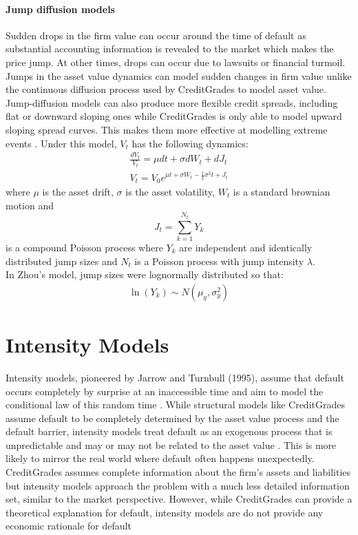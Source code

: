 \documentclass[11t,a4paper]{article}
\begin{document}
\paragraph {Jump diffusion models}
Sudden drops in the firm value can occur around the time of default as substantial accounting information is revealed to the market which makes the price jump. At other times, drops can occur due to lawsuits or financial turmoil. Jumps in the asset value dynamics can model sudden changes in firm value unlike the continuous diffusion process used by CreditGrades to model asset value. Jump-diffusion models can also produce more flexible credit spreads, including flat or downward sloping ones while CreditGrades is only able to model upward sloping spread curves. This makes them more effective at modelling extreme events \cite{zhou}. 
Under this model, $V_t$ has the following dynamics:
\begin{gather}
    \frac{dV_t}{V_t} = \mu dt + \sigma dW_t + dJ_t \\
    V_t = V_0 e^{\mu t + \sigma W_t - \frac{1}{2}\sigma^2t + J_t} 
\end{gather}
where $\mu$ is the asset drift, $\sigma$ is the asset volatility, $W_t$ is a standard brownian motion and \[J_t = \sum_{k=1}^{N_t}Y_k\]
is a compound Poisson process where $Y_k$ are independent and identically distributed jump sizes and $N_t$ is a Poisson process with jump intensity $\lambda$. \\
In Zhou's model, jump sizes were lognormally distributed so that:
\begin{align}
\ln(Y_k) \sim N(\mu_y, \sigma^2_y)
\end{align}

\section{Intensity Models}
Intensity models, pioneered by Jarrow and Turnbull (1995), assume that default occurs completely by surprise at an inaccessible time and aim to model the conditional law of this random time \cite{rf}. While structural models like CreditGrades assume default to be completely determined by the asset value process and the default barrier, intensity models treat default as an exogenous process that is unpredictable and may or may not be related to the asset value \cite {comparison}. This is more likely to mirror the real world where default often happens unexpectedly. CreditGrades assumes complete information about the firm's assets and liabilities but intensity models approach the problem with a much less detailed information set, similar to the market perspective. However, while CreditGrades can provide a theoretical explanation for default, intensity models are  do not provide any economic rationale for default 
\end{document}
